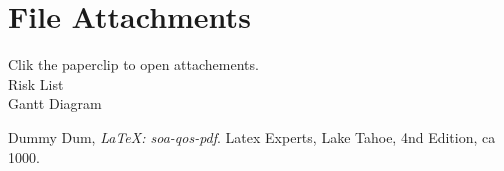 \documentclass[12pt]{article}
\begin{document}
\section{File Attachments}\label{attachments} 
Clik the paperclip to open attachements. \\
     Risk List \\
     Gantt Diagram \\
    


\begin{thebibliography}{0}

     Dummy Dum, 
        \emph{\LaTeX: soa-qos-pdf}.
        Latex Experts, Lake Tahoe,
        4nd Edition,
        ca 1000.

\end{thebibliography}
\end{document}
